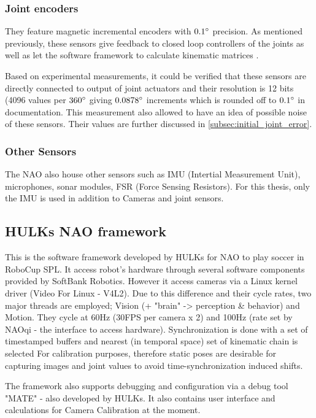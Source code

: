\documentclass[english, printversion, nomenclature, notitle]{tuvisionthesis} %
\makeatletter
\renewcommand{\todo}[2][]{\tikzexternaldisable\@todo[#1]{#2}\tikzexternalenable}
\makeatother
\begin{document}
\subsubsection{Joint encoders}
\label{subsub:jointEncoders}

They feature magnetic incremental encoders with $0.1\degree$ precision. As mentioned previously, these sensors give feedback to closed loop controllers of the joints as well as let the software framework to calculate kinematic matrices \cite{softbank_robotics_joint_nodate}.

Based on experimental measurements, it could be verified that these sensors are directly connected to output of joint actuators and their resolution is 12 bits (4096 values per $360\degree$ giving $0.0878\degree$ increments which is rounded off to $0.1\degree$ in documentation. This measurement also allowed to have an idea of possible noise of these sensors. Their values are further discussed in \cref{subsec:initial_joint_error}.

\subsubsection{Other Sensors}
The NAO also house other sensors such as IMU (Intertial Measurement Unit), microphones, sonar modules, FSR (Force Sensing Resistors). For this thesis, only the IMU is used in addition to Cameras and joint sensors.

\subsection{HULKs NAO framework}
This is the software framework developed by HULKs for NAO to play soccer in RoboCup SPL. It access robot's hardware through several software components provided by SoftBank Robotics. However it access cameras via a Linux kernel driver (Video For Linux - V4L2). Due to this difference and their cycle rates, two major threads are employed; Vision (+ "brain" -> perception \& behavior) \todo{check this} and Motion. They cycle at 60Hz (30FPS per camera x 2) and 100Hz (rate set by NAOqi - the interface to access hardware)\todo{V6 updates}. Synchronization is done with a set of timestamped buffers and nearest (in temporal space) set of kinematic chain is selected For calibration purposes, therefore static poses are desirable for capturing images and joint values to avoid time-synchronization induced shifts.

The framework also supports debugging and configuration via a debug tool "MATE" - also developed by HULKs. It also contains user interface and calculations for Camera Calibration at the moment.
\end{document}

